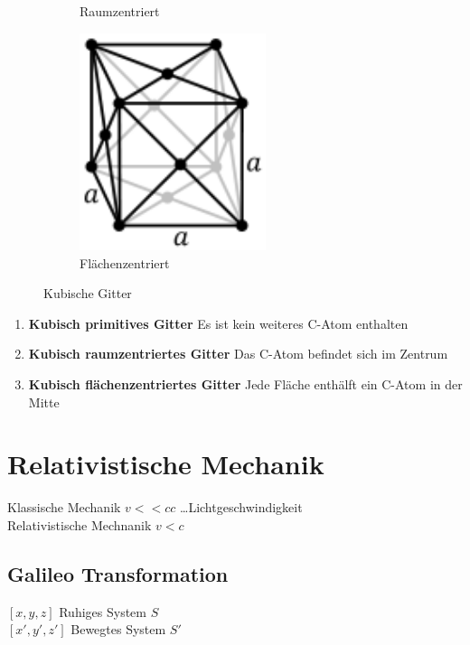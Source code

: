 \documentclass[a4paper,11pt]{article}
\begin{document}
\begin{figure}[!ht]
\begin{subfigure}[!ht]{0.2\textwidth}
        \caption[https://de.wikipedia.org/wiki/Bravais-Gitter]{Raumzentriert}
    \end{subfigure}
    \begin{subfigure}[!ht]{0.2\textwidth}
        \centering
        \includegraphics[width=0.6\textwidth]{cubic-face-centered.png}
        \caption[https://de.wikipedia.org/wiki/Bravais-Gitter]{Flächenzentriert}
    \end{subfigure}
    \caption[https://de.wikipedia.org/wiki/Bravais-Gitter]{Kubische Gitter}
\end{figure}

\begin{enumerate}[label= (\alph*)]
    \item \textbf{Kubisch primitives Gitter} Es ist kein weiteres C-Atom enthalten
    \item \textbf{Kubisch raumzentriertes Gitter} Das C-Atom befindet sich im Zentrum
    \item \textbf{Kubisch flächenzentriertes Gitter} Jede Fläche enthälft ein C-Atom in der Mitte
\end{enumerate}

\newpage
\section{Relativistische Mechanik}
Klassische Mechanik $v << c$\hfill$c$ \dots Lichtgeschwindigkeit\\
Relativistische Mechnanik $v < c$

\subsection{Galileo Transformation}
$[x, y, z]$ Ruhiges System $S$\\
$[x', y', z']$ Bewegtes System $S'$
\end{document}
